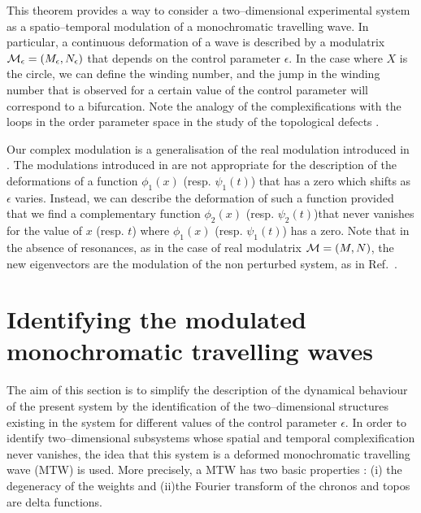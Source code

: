 This theorem provides a way to consider a two--dimensional experimental
system as a spatio--temporal modulation of a monochromatic 
travelling wave.
In particular, a continuous deformation of a wave
is described by a modulatrix ${\cal M_\epsilon}=(M_\epsilon,N_\epsilon)$
that depends on the control parameter $\epsilon$. 
In the case where $X$ is the circle, we can define the winding number,
and the jump in the winding number that is observed for a certain
value of the control parameter will correspond to a bifurcation. 
Note the analogy of the complexifications with the loops in the
order parameter space in the study of the topological
defects \cite {Mermin}.

\medskip

Our complex modulation is a generalisation of the real modulation
introduced in \cite{LimaMod}.
The modulations introduced in \cite{LimaMod} are not appropriate 
for the description of the deformations of a function $\phi_1(x)$
 (resp. $\psi_1(t)$) that has a zero which shifts as $\epsilon$ varies.
Instead, we can describe the deformation of such a function provided 
that we find a complementary function $\phi_2(x)$ 
(resp. $\psi_2(t)$)that never vanishes for the value of $x$ 
(resp. $t$) where $\phi_1(x)$ (resp. $\psi_1(t)$) has a zero. 
Note that in the absence of resonances, as in the case of real 
modulatrix ${\cal M}=(M,N)$,
the new eigenvectors are 
the modulation of the non perturbed system, as in Ref.~\cite{LimaMod}.








 \section{Identifying the modulated monochromatic travelling waves}
\label{LookModTW}

The aim of this section is to simplify the description of the 
dynamical behaviour of the present system by  the  identification
of the  two--dimensional structures existing in the system for
 different values of the control parameter $\epsilon$. 
In order to identify two--dimensional subsystems whose spatial and
temporal complexification never vanishes, the idea that this system is
a deformed monochromatic travelling wave (MTW) is used.
More precisely, a MTW has two basic properties : (i) the degeneracy
of the weights and (ii)the Fourier transform of the chronos and
topos are delta functions. 

